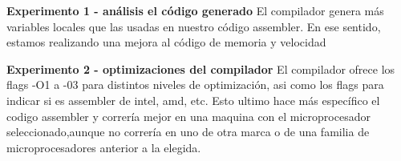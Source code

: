\vspace*{0.3cm} \noindent
\textbf{Experimento 1 - análisis el código generado}
El compilador genera más variables locales que las usadas en nuestro c\'odigo assembler. En ese sentido, estamos realizando una mejora al c\'odigo de memoria y velocidad


\vspace*{0.3cm} \noindent
\textbf{Experimento 2 - optimizaciones del compilador}
El compilador ofrece los flags -O1 a -03 para distintos niveles de optimizaci\'on, asi como los flags para indicar si es assembler de intel, amd, etc. Esto ultimo hace m\'as espec\'ifico el codigo assembler y correr\'ia mejor en una maquina con el microprocesador seleccionado,aunque no correr\'ia en uno de otra marca o de una familia de microprocesadores anterior a la elegida.
